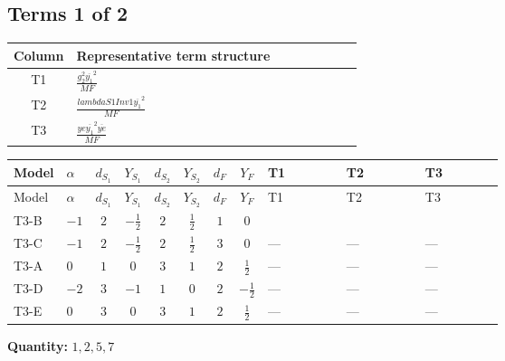\documentclass[8pt]{article}
\begin{document}
\begin{landscape}
\subsection*{Terms 1 of 2}
\begin{center}
\begin{tabular}{@{}c >{\raggedright\arraybackslash}p{0.82\linewidth}@{}}
\toprule
Column & Representative term structure \\
\midrule
T1 & \(\displaystyle \frac{g_{2}^{2} \overline{y_{1}}^{2}}{MF}\) \\
\midrule
T2 & \(\displaystyle \frac{lambdaS1Inv1 \overline{y_{1}}^{2}}{MF}\) \\
\midrule
T3 & \(\displaystyle \frac{ye \overline{y_{1}}^{2} \overline{ye}}{MF}\) \\
\midrule
\bottomrule
\end{tabular}
\end{center}
\smallskip
\tiny
\begin{longtable}{@{}llcccccc >{\raggedright\arraybackslash}p{0.21\linewidth} >{\raggedright\arraybackslash}p{0.21\linewidth} >{\raggedright\arraybackslash}p{0.21\linewidth}@{}}
\toprule
Model & $\alpha$ & $d_{S_1}$ & $Y_{S_1}$ & $d_{S_2}$ & $Y_{S_2}$ & $d_F$ & $Y_F$ & T1 & T2 & T3 \\
\midrule
\endfirsthead
\toprule
Model & $\alpha$ & $d_{S_1}$ & $Y_{S_1}$ & $d_{S_2}$ & $Y_{S_2}$ & $d_F$ & $Y_F$ & T1 & T2 & T3 \\
\midrule
\endhead
T3-B & $-1$ & $2$ & $-\frac{1}{2}$ & $2$ & $\frac{1}{2}$ & $1$ & $0$ & \scriptsize\adjustbox{max width=\linewidth}{$\begin{gathered} - \frac{3 g_{2}^{2} \overline{y_{1}}^{2}}{8 MF}\end{gathered}$} & \scriptsize\adjustbox{max width=\linewidth}{$\begin{gathered} - \frac{lambdaS1Inv1 \overline{y_{1}}^{2}}{4 MF}\end{gathered}$} & \scriptsize\adjustbox{max width=\linewidth}{$\begin{gathered} \frac{ye \overline{y_{1}}^{2} \overline{ye}}{8 MF}\end{gathered}$} \\
\midrule
T3-C & $-1$ & $2$ & $-\frac{1}{2}$ & $2$ & $\frac{1}{2}$ & $3$ & $0$ & --- & --- & --- \\
\midrule
T3-A & $0$ & $1$ & $0$ & $3$ & $1$ & $2$ & $\frac{1}{2}$ & --- & --- & --- \\
\midrule
T3-D & $-2$ & $3$ & $-1$ & $1$ & $0$ & $2$ & $-\frac{1}{2}$ & --- & --- & --- \\
\midrule
T3-E & $0$ & $3$ & $0$ & $3$ & $1$ & $2$ & $\frac{1}{2}$ & --- & --- & --- \\
\midrule
\bottomrule
\end{longtable}
\clearpage
\noindent\textbf{Quantity: }$\mathrm{1,2,5,7}$\par\smallskip

\end{landscape}
\end{document}
